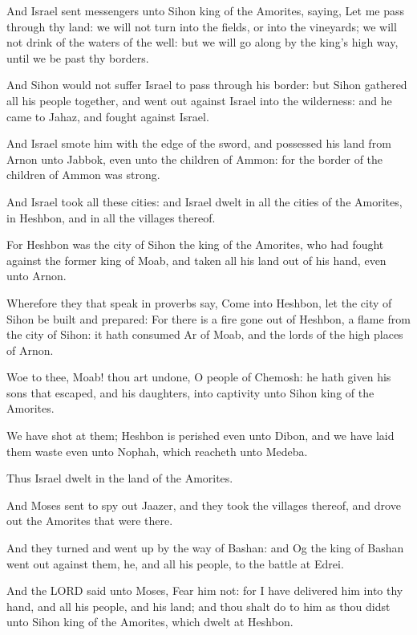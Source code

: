 \verse And Israel sent messengers unto Sihon king of the Amorites,
saying, \verse Let me pass through thy land: we will not turn into the
fields, or into the vineyards; we will not drink of the waters of the
well: but we will go along by the king's high way, until we be past
thy borders.

\verse And Sihon would not suffer Israel to pass through his border:
but Sihon gathered all his people together, and went out against
Israel into the wilderness: and he came to Jahaz, and fought against
Israel.

\verse And Israel smote him with the edge of the sword, and possessed
his land from Arnon unto Jabbok, even unto the children of Ammon: for
the border of the children of Ammon was strong.

\verse And Israel took all these cities: and Israel dwelt in all the
cities of the Amorites, in Heshbon, and in all the villages thereof.

\verse For Heshbon was the city of Sihon the king of the Amorites, who
had fought against the former king of Moab, and taken all his land out
of his hand, even unto Arnon.

\verse Wherefore they that speak in proverbs say, Come into Heshbon,
let the city of Sihon be built and prepared: \verse For there is a fire
gone out of Heshbon, a flame from the city of Sihon: it hath consumed
Ar of Moab, and the lords of the high places of Arnon.

\verse Woe to thee, Moab! thou art undone, O people of Chemosh: he hath
given his sons that escaped, and his daughters, into captivity unto
Sihon king of the Amorites.

\verse We have shot at them; Heshbon is perished even unto Dibon, and
we have laid them waste even unto Nophah, which reacheth unto Medeba.

\verse Thus Israel dwelt in the land of the Amorites.

\verse And Moses sent to spy out Jaazer, and they took the villages
thereof, and drove out the Amorites that were there.

\verse And they turned and went up by the way of Bashan: and Og the
king of Bashan went out against them, he, and all his people, to the
battle at Edrei.

\verse And the LORD said unto Moses, Fear him not: for I have delivered
him into thy hand, and all his people, and his land; and thou shalt do
to him as thou didst unto Sihon king of the Amorites, which dwelt at
Heshbon.

